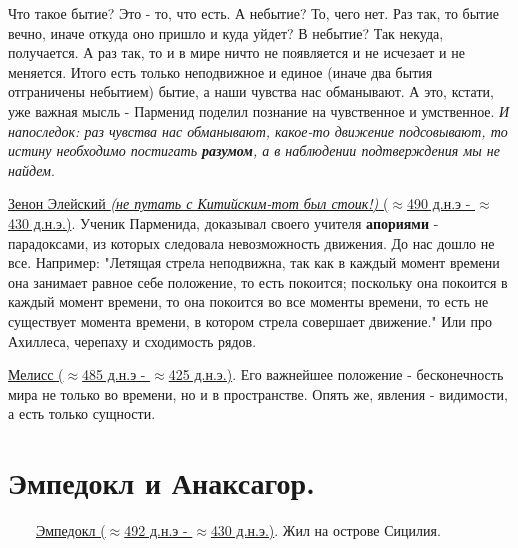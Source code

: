 \documentclass[12pt,a4paper]{article}
\begin{document}

Что такое бытие? Это - то, что есть. А небытие? То, чего нет. Раз так, то бытие вечно, иначе откуда оно пришло и куда уйдет? В небытие? Так некуда, получается. А раз так, то и в мире ничто не появляется и не исчезает и не меняется. Итого есть только неподвижное и единое (иначе два бытия отграничены небытием) бытие, а наши чувства нас обманывают. А это, кстати, уже важная мысль - Парменид поделил познание на чувственное и умственное. \textit{И напоследок: раз чувства нас обманывают, какое-то движение подсовывают, то истину необходимо постигать \textbf{разумом}, а в наблюдении подтверждения мы не найдем}.

\underline{Зенон Элейский \textit{(не путать с Китийским-тот был стоик!)} ($\approx$490 д.н.э - $\approx$430 д.н.э.)}. Ученик Парменида, доказывал своего учителя \textbf{апориями} - парадоксами, из которых следовала невозможность движения. До нас дошло не все. Например: "Летящая стрела неподвижна, так как в каждый момент времени она занимает равное себе положение, то есть покоится; поскольку она покоится в каждый момент времени, то она покоится во все моменты времени, то есть не существует момента времени, в котором стрела совершает движение." Или про Ахиллеса, черепаху и сходимость рядов.

\underline{Мелисс ($\approx$485 д.н.э - $\approx$425 д.н.э.)}. Его важнейшее положение - бесконечность мира не только во времени, но и в пространстве. Опять же, явления - видимости, а есть только сущности.



\section{Эмпедокл и Анаксагор.}
\ \ \ \
\underline{Эмпедокл ($\approx$492 д.н.э - $\approx$430 д.н.э.)}. Жил на острове Сицилия.
\end{document}

